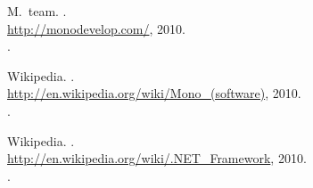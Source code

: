 \begin{thebibliography}{99}
M.~team.
.
\\\newblock \url{http://monodevelop.com/}, 2010.
\\.

Wikipedia.
.
\\\newblock \url{http://en.wikipedia.org/wiki/Mono_(software)}, 2010.
\\.

Wikipedia.
.
\\\newblock \url{http://en.wikipedia.org/wiki/.NET_Framework}, 2010.
\\.
\end{thebibliography}
